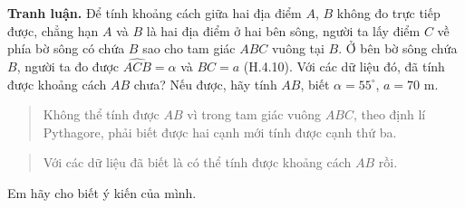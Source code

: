 \begin{lesson}
    \answerline
    \answerline

    \textbf{Tranh luận.} Để tính khoảng cách giữa hai địa điểm $A$, $B$ không đo trực tiếp được, chẳng hạn $A$ và $B$ là hai địa điểm ở hai bên sông, người ta lấy điểm $C$ về phía bờ sông có chứa $B$ sao cho tam giác $ABC$ vuông tại $B$. Ở bên bờ sông chứa $B$, người ta đo được $\widehat{ACB}=\alpha$ và $BC=a$ (H.4.10). Với các dữ liệu đó, đã tính được khoảng cách $AB$ chưa? Nếu được, hãy tính $AB$, biết $\alpha=55^\circ$, $a=70$ m.

    \begin{center}
    \end{center}

    \begin{quote}
        Không thể tính được $AB$ vì trong tam giác vuông $ABC$, theo định lí Pythagore, phải biết được hai cạnh mới tính được cạnh thứ ba.
    \end{quote}

    \begin{quote}
        Với các dữ liệu đã biết là có thể tính được khoảng cách $AB$ rồi.
    \end{quote}

    Em hãy cho biết ý kiến của mình.

    \answerline
    \answerline
\end{lesson}




